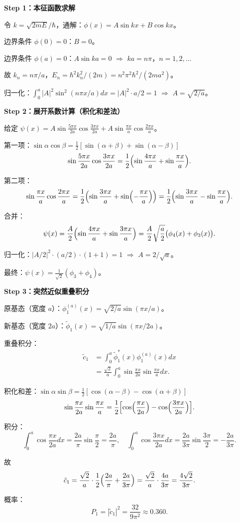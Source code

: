 \begin{derivationbox}
\textbf{Step 1：本征函数求解}

令 $k=\sqrt{2mE}/\hbar$，通解：$\phi(x)=A\sin kx+B\cos kx$。

边界条件 $\phi(0)=0$：$B=0$。

边界条件 $\phi(a)=0$：$A\sin ka=0$ $\Rightarrow$ $ka=n\pi$，$n=1,2,\ldots$

故 $k_n=n\pi/a$，$E_n=\hbar^2k_n^2/(2m)=n^2\pi^2\hbar^2/(2ma^2)$。

归一化：$\int_0^a|A|^2\sin^2(n\pi x/a)dx=|A|^2\cdot a/2=1$ $\Rightarrow$ $A=\sqrt{2/a}$。

\textbf{Step 2：展开系数计算（积化和差法）}

给定 $\psi(x)=A\sin\frac{5\pi x}{2a}\cos\frac{3\pi x}{2a}+A\sin\frac{\pi x}{a}\cos\frac{2\pi x}{a}$。

第一项：$\sin\alpha\cos\beta=\frac12[\sin(\alpha+\beta)+\sin(\alpha-\beta)]$
\[
\sin\frac{5\pi x}{2a}\cos\frac{3\pi x}{2a}=\frac12\Bigl(\sin\frac{4\pi x}{a}+\sin\frac{\pi x}{a}\Bigr).
\]

第二项：
\[
\sin\frac{\pi x}{a}\cos\frac{2\pi x}{a}=\frac12\Bigl(\sin\frac{3\pi x}{a}+\sin\Bigl(-\frac{\pi x}{a}\Bigr)\Bigr)=\frac12\Bigl(\sin\frac{3\pi x}{a}-\sin\frac{\pi x}{a}\Bigr).
\]

合并：
\[
\psi(x)=\frac{A}{2}\Bigl(\sin\frac{4\pi x}{a}+\sin\frac{3\pi x}{a}\Bigr)=\frac{A}{2}\sqrt{\frac{a}{2}}\bigl(\phi_4(x)+\phi_3(x)\bigr).
\]

归一化：$|A/2|^2\cdot(a/2)\cdot(1+1)=1$ $\Rightarrow$ $A=2/\sqrt{a}$。

最终：$\psi(x)=\frac{1}{\sqrt{2}}(\phi_3+\phi_4)$。

\textbf{Step 3：突然近似重叠积分}

原基态（宽度 $a$）：$\phi_1^{(a)}(x)=\sqrt{2/a}\sin(\pi x/a)$。

新基态（宽度 $2a$）：$\tilde{\phi}_1(x)=\sqrt{1/a}\sin(\pi x/2a)$。

重叠积分：
\begin{align*}
\tilde{c}_1&=\int_0^a\tilde{\phi}_1^*(x)\phi_1^{(a)}(x)dx\\
&=\frac{\sqrt{2}}{a}\int_0^a\sin\frac{\pi x}{2a}\sin\frac{\pi x}{a}dx.
\end{align*}

积化和差：$\sin\alpha\sin\beta=\frac12[\cos(\alpha-\beta)-\cos(\alpha+\beta)]$
\[
\sin\frac{\pi x}{2a}\sin\frac{\pi x}{a}=\frac12\Bigl[\cos\Bigl(\frac{\pi x}{2a}\Bigr)-\cos\Bigl(\frac{3\pi x}{2a}\Bigr)\Bigr].
\]

积分：
\[
\int_0^a\cos\frac{\pi x}{2a}dx=\frac{2a}{\pi}\sin\frac{\pi}{2}=\frac{2a}{\pi},
\quad
\int_0^a\cos\frac{3\pi x}{2a}dx=\frac{2a}{3\pi}\sin\frac{3\pi}{2}=-\frac{2a}{3\pi}.
\]

故
\[
\tilde{c}_1=\frac{\sqrt{2}}{a}\cdot\frac12\Bigl(\frac{2a}{\pi}+\frac{2a}{3\pi}\Bigr)=\frac{\sqrt{2}}{a}\cdot\frac{4a}{3\pi}=\frac{4\sqrt{2}}{3\pi}.
\]

概率：
\[
P_1=|\tilde{c}_1|^2=\frac{32}{9\pi^2}\approx0.360.
\]
\end{derivationbox}

\vspace{1em}
